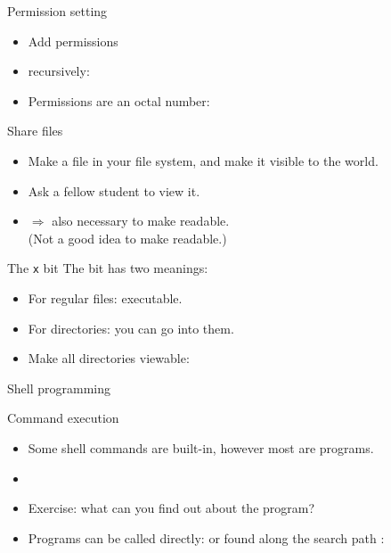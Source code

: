 \documentclass[11pt,headernav]{beamer}
\begin{document}
\begin{numberedframe}{Permission setting}
  \label{sl-lnx:755}
  \begin{itemize}
  \item Add permissions 
  \item recursively: 
  \item Permissions are an octal number:
  \end{itemize}
\end{numberedframe}


\begin{numberedframe}{Share files}
  \label{sl-lnx:share}
  \begin{itemize}
  \item Make a file in your  file system,
    and make it visible to the world.
  \item Ask a fellow student to view it.
  \item $\Rightarrow$ also necessary to make  readable.\\
    (Not a good idea to make  readable.)
  \end{itemize}
\end{numberedframe}

\begin{numberedframe}{The \texttt{x} bit}
  \label{sl-lnx:x}
  The  bit has two meanings:
  \begin{itemize}
  \item For regular files: executable.
  \item For directories: you can go into them.
  \item Make all directories viewable:\\
  \end{itemize}
\end{numberedframe}

 {Shell programming}

\begin{numberedframe}{Command execution}
  \label{sl-lnx:execute}
  \begin{itemize}
  \item Some shell commands are built-in, however most are programs.
  \item {}
  \item Exercise: what can you find out about the  program?
  \item Programs can be called directly: 
    or found along the search path :\\
  \end{itemize}
\end{numberedframe}
\end{document}
